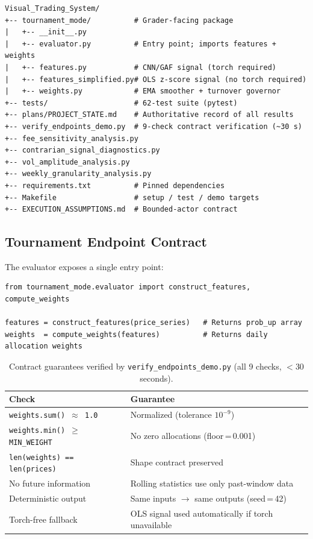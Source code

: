 \documentclass[11pt,letterpaper]{article}
\begin{document}
\begin{lstlisting}[style=bash, caption={Repository structure.}]
Visual_Trading_System/
+-- tournament_mode/          # Grader-facing package
|   +-- __init__.py
|   +-- evaluator.py          # Entry point; imports features + weights
|   +-- features.py           # CNN/GAF signal (torch required)
|   +-- features_simplified.py# OLS z-score signal (no torch required)
|   +-- weights.py            # EMA smoother + turnover governor
+-- tests/                    # 62-test suite (pytest)
+-- plans/PROJECT_STATE.md    # Authoritative record of all results
+-- verify_endpoints_demo.py  # 9-check contract verification (~30 s)
+-- fee_sensitivity_analysis.py
+-- contrarian_signal_diagnostics.py
+-- vol_amplitude_analysis.py
+-- weekly_granularity_analysis.py
+-- requirements.txt          # Pinned dependencies
+-- Makefile                  # setup / test / demo targets
+-- EXECUTION_ASSUMPTIONS.md  # Bounded-actor contract
\end{lstlisting}

\subsection{Tournament Endpoint Contract}

The evaluator exposes a single entry point:
\begin{lstlisting}[style=python, caption={Tournament entry point usage.}]
from tournament_mode.evaluator import construct_features, compute_weights

features = construct_features(price_series)   # Returns prob_up array
weights  = compute_weights(features)          # Returns daily allocation weights
\end{lstlisting}

\begin{table}[H]
  \centering
  \caption{Contract guarantees verified by \texttt{verify\_endpoints\_demo.py}
           (all 9 checks, $<$30 seconds).}
  \label{tab:contract}
  \begin{tabular}{ll}
    \toprule
    \textbf{Check} & \textbf{Guarantee} \\
    \midrule
    \texttt{weights.sum() $\approx$ 1.0} & Normalized (tolerance $10^{-9}$) \\
    \texttt{weights.min() $\geq$ MIN\_WEIGHT} & No zero allocations (floor\,=\,0.001) \\
    \texttt{len(weights) == len(prices)} & Shape contract preserved \\
    No future information & Rolling statistics use only past-window data \\
    Deterministic output  & Same inputs $\to$ same outputs (seed\,=\,42) \\
    Torch-free fallback   & OLS signal used automatically if torch unavailable \\
    \bottomrule
  \end{tabular}
\end{table}
\end{document}
